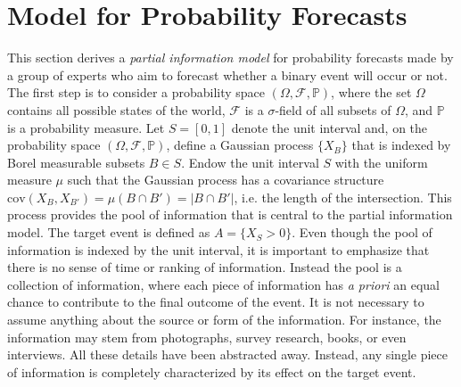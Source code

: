 \documentclass[11pt]{article}
\renewcommand{\P}{\mathbb{P}}
\theoremstyle{definition}
\theoremstyle{definition}
\begin{document}
\section{Model for Probability Forecasts}
\label{Model}
This section derives a \textit{partial information model} for probability forecasts made by a group of experts who aim to forecast whether a binary event will occur or not. The first step is to consider a probability space  $(\Omega, \mathcal{F}, \P)$, where the set $\Omega$ contains all possible states of the world,  $\mathcal{F}$ is a $\sigma$-field of all subsets of $\Omega$, and $\P$ is a probability measure. Let $S = [0,1]$ denote the unit interval and, on the probability space $(\Omega, \mathcal{F}, \P)$, define a Gaussian process $\{ X_B \}$ that is indexed by Borel measurable subsets $B \in S$. Endow the unit interval $S$ with the uniform measure $\mu$ such that the Gaussian process has a covariance structure $\text{cov}(X_B, X_{B'}) = \mu(B \cap B') = |B \cap B'|$, i.e. the length of the intersection. This process provides the pool of information that is central to the partial information model. The target event is defined as $A = \{ X_{S} > 0\}$. Even though the pool of information is indexed by the unit interval, it is important to emphasize that there is no sense of time or ranking of information. Instead the pool is a collection of information, where each piece of information has \textit{a priori} an equal chance to contribute to the final outcome of the event. It is not necessary to assume anything about the source or form of the information. For instance, the information may stem from photographs, survey research, books, or even interviews. All these details have been abstracted away. Instead, any single piece of information is completely characterized by its effect on the target event. 
\end{document}
